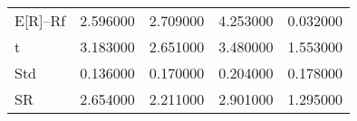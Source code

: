 \begin{tabular}{lrrrr}
\toprule
\midrule
E[R]--Rf & 2.596000 & 2.709000 & 4.253000 & 0.032000 \\
t & 3.183000 & 2.651000 & 3.480000 & 1.553000 \\
Std & 0.136000 & 0.170000 & 0.204000 & 0.178000 \\
SR & 2.654000 & 2.211000 & 2.901000 & 1.295000 \\
\bottomrule
\end{tabular}
